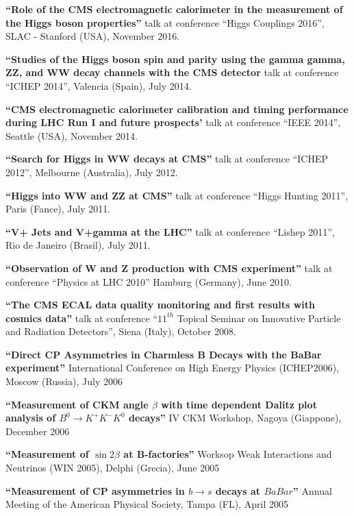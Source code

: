   {\bf ``Role of the CMS electromagnetic calorimeter in the measurement of the Higgs boson properties''}
  talk at conference ``Higgs Couplings 2016'', SLAC - Stanford (USA), November 2016.

  {\bf ``Studies of the Higgs boson spin and parity using the gamma gamma, ZZ, and WW decay channels with the CMS detector}
  talk at conference ``ICHEP 2014'', Valencia (Spain), July 2014.

  {\bf ``CMS electromagnetic calorimeter calibration and timing         
  performance during LHC Run I and future prospects'}
  talk at conference ``IEEE 2014'', Seattle (USA), November 2014.

  {\bf ``Search for Higgs in WW decays at CMS''}
  talk at conference ``ICHEP 2012'', Melbourne (Australia), July 2012.

  {\bf ``Higgs into WW and ZZ at CMS''}
  talk at conference ``Higgs Hunting 2011'', Paris (Fance), July 2011.

  {\bf ``V+ Jets and V+gamma at the LHC''}
  talk at conference ``Lishep 2011'', Rio de Janeiro (Brasil), July 2011.

  {\bf ``Observation of W and Z production with CMS experiment'' }
  talk at conference ``Physics at LHC 2010'' Hamburg (Germany), June 2010.

  {\bf ``The CMS ECAL data quality monitoring and first results with cosmics data''}
  talk at conference ``$11^{th}$ Topical Seminar on Innovative Particle and Radiation Detectors'',
  Siena (Italy), October 2008.

  {\bf ``Direct CP Asymmetries in Charmless B Decays with the BaBar experiment''}
  International Conference on High Energy Physics (ICHEP2006), Moscow (Russia), July 2006
  \vspace{3mm}

  {\bf ``Measurement of CKM angle $\beta$ with time dependent Dalitz plot analysis of 
    $B^0\rightarrow K^+K^-K^0$ decays''}
  IV CKM Workshop, Nagoya (Giappone), December 2006

  {\bf ``Measurement of $\sin 2\beta$ at B-factories''}
  Worksop Weak Interactions and Neutrinos (WIN 2005), Delphi (Grecia), June 2005
  \vspace{3mm}

  {\bf ``Measurement of CP asymmetries in $b \rightarrow s$ decays at $BaBar$''}
  Annual Meeting of the American Physical Society, Tampa (FL), April 2005
  \vspace{3mm}


